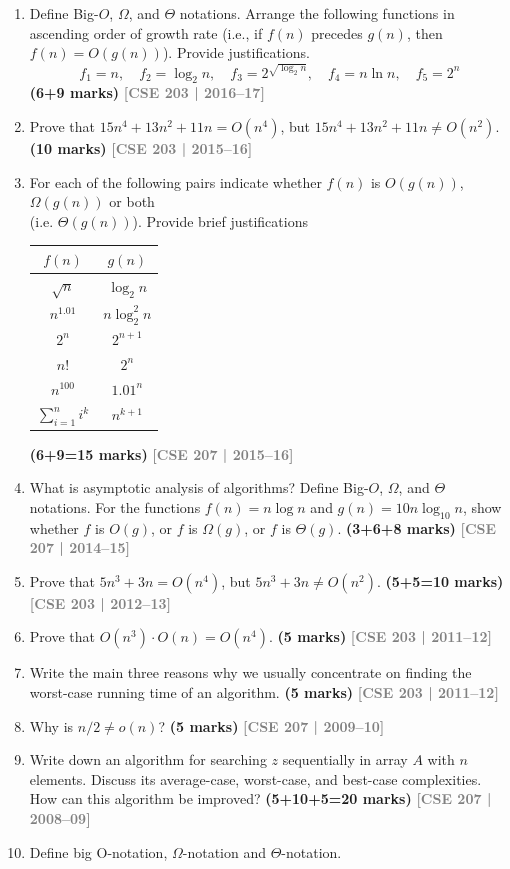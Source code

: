 \documentclass[12pt,a3paper]{article}
\newcommand{\yr}[1]{\hfill\textcolor{gray}{\small\textbf{[#1]}}}
\newcommand{\mk}[1]{\textcolor{orange!70!black}{\small\textbf{(#1 marks)}}}
\begin{document}
\begin{enumerate}
\item Define Big-$O$, $\Omega$, and $\Theta$ notations. Arrange the following functions in ascending order of growth rate (i.e., if $f(n)$ precedes $g(n)$, then $f(n) = O(g(n))$). Provide justifications.
\[ f_1 = n, \quad f_2 = \log_2 n, \quad f_3 = 2^{\sqrt{\log_2 n}}, \quad f_4 = n \ln n, \quad f_5 = 2^n \]
\mk{6+9}
\yr{CSE 203 | 2016--17}

\item Prove that $15n^4 + 13n^2 + 11n = O(n^4)$, but $15n^4 + 13n^2 + 11n \neq O(n^2)$. \mk{10}
\yr{CSE 203 | 2015--16}

\item  For each of the following pairs indicate whether $f(n)$ is $O(g(n))$, $\Omega(g(n))$ or both \\
(i.e. $\Theta(g(n))$). Provide brief justifications
\begin{center}
\begin{tabular}{|c|c|}
\hline
$f(n)$ & $g(n)$ \\
\hline
$\sqrt{n}$ & $\log_2 n$ \\
\hline
$n^{1.01}$ & $n \log_2^2 n$ \\
\hline
$2^n$ & $2^{n+1}$ \\
\hline
$n!$ & $2^n$ \\
\hline
$n^{100}$ & $1.01^n$ \\
\hline
$\sum_{i=1}^{n} i^k$ & $n^{k+1}$ \\
\hline
\end{tabular}
\end{center}
\mk{6+9=15}
\yr{CSE 207 | 2015--16}

\item What is asymptotic analysis of algorithms? Define Big-$O$, $\Omega$, and $\Theta$ notations. For the functions $f(n) = n\log n$ and $g(n) = 10n\log_{10} n$, show whether $f$ is $O(g)$, or $f$ is $\Omega(g)$, or $f$ is $\Theta(g)$. \mk{3+6+8}
\yr{CSE 207 | 2014--15}

\item Prove that $5n^3 + 3n = O(n^4)$, but $5n^3 + 3n \neq O(n^2)$. \mk{5+5=10}
\yr{CSE 203 | 2012--13}

\item Prove that $O(n^3) \cdot O(n) = O(n^4)$. \mk{5}
\yr{CSE 203 | 2011--12}

\item Write the main three reasons why we usually concentrate on finding the worst-case running time of an algorithm. \mk{5}
\yr{CSE 203 | 2011--12}

\item Why is $n/2 \neq o(n)$? \mk{5}
\yr{CSE 207 | 2009--10}

\item Write down an algorithm for searching $z$ sequentially in array $A$ with $n$ elements. Discuss its average-case, worst-case, and best-case complexities. How can this algorithm be improved? \mk{5+10+5=20}
\yr{CSE 207 | 2008--09}

\item  Define big O-notation, $\Omega$-notation and $\Theta$-notation.

\end{enumerate}
\newpage
\end{document}
